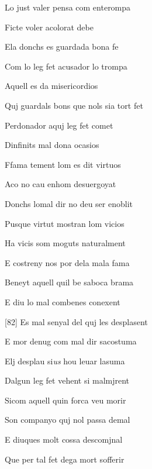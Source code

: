 \documentclass[12pt]{article}
\begin{document}
\begin{estrofa}

 Lo just valer pensa com enterompa

 Ficte voler acolorat debe

 Ela donchs es guardada bona fe

 Com lo leg fet acusador lo trompa

 Aquell es da misericordios

 Quj guardals bons que nols sia tort fet

 Perdonador aquj leg fet comet

 Dinfinits mal dona ocasios

\end{estrofa}



\begin{estrofa}

 Ffama tement lom es dit virtuos

 Aco no cau enhom desuergoyat

 Donchs lomal dir no deu ser enoblit

 Pusque virtut mostran lom vicios

 Ha vicis som moguts naturalment

 E costreny nos por dela mala fama

 Beneyt aquell quil be saboca brama

 E diu lo mal combenes conexent

\end{estrofa}



\begin{estrofa}

 [82] Es mal senyal del quj les desplasent

 E mor denug com mal dir sacostuma

 Elj desplau si\textit{us} hou leuar lasuma

 Dalgun leg fet vehent si malmjrent

 Sicom aquell quin forca veu morir

 Son companyo quj nol passa demal

 E diuques molt cossa descomjnal

 Que per tal fet dega mort sofferir

\end{estrofa}
\end{document}
